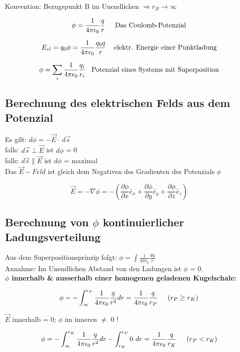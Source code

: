 Konvention: Bezugspunkt B im Unendlichen $\Rightarrow r_B \rightarrow \infty$
\begin{formulabox}
    \[
    \phi = \frac{1}{4\pi\epsilon_0}\frac{q}{r} \hspace{5mm} \text{Das Coulomb-Potenzial}
    \]
\end{formulabox}
\begin{formulabox}
    \[
    E_{el} = q_0\phi = \frac{1}{4\pi\epsilon_0}\frac{q_0 q}{r} \hspace{4mm} \text{elektr. Energie einer Punktladung}
    \]
\end{formulabox}
\begin{formulabox}
    \[
    \phi = \sum_i \frac{1}{4\pi\epsilon_0}\frac{q_i}{r_i} \hspace{3mm} \text{Potenzial eines Systems mit Superposition}
    \]
\end{formulabox}
\subsection{Berechnung des elektrischen Felds aus dem Potenzial}
Es gilt: $d\phi = -\Vec{E}\cdot\ d\Vec{s}$\\
\hspace{5mm} falls: $d\Vec{s} \perp \Vec{E}$ ist $d\phi$ = 0\\
\hspace{5mm} falls: $d\Vec{s} \parallel \Vec{E}$ ist $d\phi$ = maximal
\\[1ex]
Das $\Vec{E}-Feld$ ist gleich dem Negativen des Gradienten des Potenzials $\phi$
\begin{formulabox}
    \[
    \Vec{E} = -\nabla\phi = -\left(\frac{\partial\phi}{\partial x}\hat{e}_x + \frac{\partial\phi}{\partial y}\hat{e}_y + \frac{\partial\phi}{\partial z}\hat{e}_z\right)
    \]
\end{formulabox}

\subsection{Berechnung von \texorpdfstring{$\phi$}{phi} kontinuierlicher Ladungsverteilung}
Aus dem Superpositionsprinzip folgt: $\phi = \int \frac{1}{4\pi\epsilon_0}\frac{dq}{r}$\\
Annahme: Im Unendlichen Abstand von den Ladungen ist $\phi$ = 0.
\\[2ex]
\textbf{$\phi$ innerhalb \& ausserhalb einer homogenen geladenen Kugelschale:}
\begin{formulabox}
    \[
    \phi = -\int_{\infty}^{r_P} \frac{1}{4\pi\epsilon_0}\frac{q}{r^2}dr = \frac{1}{4\pi\epsilon_0}\frac{q}{r_P} \hspace{5mm} (r_P \geq r_K)
    \]
\end{formulabox}
$\Vec{E}$ innerhalb = 0; $\phi$ im inneren $\neq$ 0 !
\begin{formulabox}
    \[  
    \phi = -\int_{\infty}^{r_K} \frac{1}{4\pi\epsilon_0}\frac{q}{r^2}dr -\int_{r_K}^{r_P} 0 \ dr = \frac{1}{4\pi\epsilon_0}\frac{q}{r_K} \hspace{5mm} (r_P < r_K) 
    \]
\end{formulabox}

